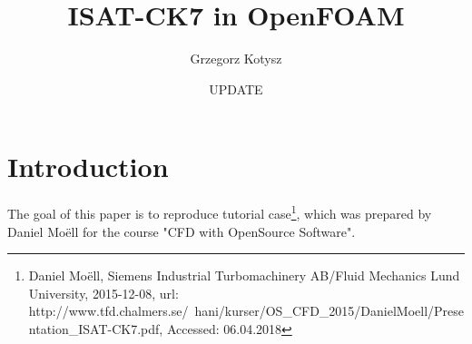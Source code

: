 \documentclass[12pt,english]{article}
\begin{document}
\title{ISAT-CK7 in OpenFOAM}


\author{Grzegorz Kotysz}


\date{UPDATE}

\maketitle
\newpage{}

\tableofcontents{}

\newpage{}

\section{Introduction}

The goal of this paper is to reproduce tutorial case\footnote{Daniel Moëll, Siemens Industrial Turbomachinery AB/Fluid Mechanics Lund University, 2015-12-08, url: http://www.tfd.chalmers.se/~hani/kurser/OS_CFD_2015/DanielMoell/Presentation_ISAT-CK7.pdf, Accessed: 06.04.2018}, which was prepared by Daniel Moëll for the course "CFD with OpenSource Software". 
\end{document}
